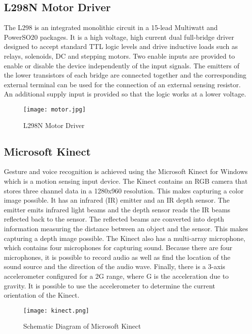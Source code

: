 \subsection{L298N Motor Driver}
The L298 is an integrated monolithic circuit in a 15-lead Multiwatt and PowerSO20 packages. It is a high voltage, high current dual full-bridge driver designed to accept standard TTL logic levels and drive inductive loads such as relays, solenoids, DC and stepping motors. Two enable inputs are provided to enable or disable the device independently of the input signals. The emitters of the lower transistors of each bridge are connected together and the corresponding external terminal can be used for the connection of an external sensing resistor. An additional supply input is provided so that the logic works at a lower voltage.

\begin{figure}[H]
  \centering
  \texttt{[image: motor.jpg]}
  \caption{L298N Motor Driver}
  \label{L298N motor driver}	
\end{figure}



\subsection{Microsoft Kinect}
Gesture and voice recognition is achieved using the Microsoft Kinect for Windows which is a motion sensing input device. The Kinect contains an RGB camera that stores three channel data in a 1280x960 resolution. This makes capturing a color image possible. It has an infrared (IR) emitter and an IR depth sensor. The emitter emits infrared light beams and the depth sensor reads the IR beams reflected back to the sensor. The reflected beams are converted into depth information measuring the distance between an object and the sensor. This makes capturing a depth image possible. The Kinect also has a multi-array microphone, which contains four microphones for capturing sound. Because there are four microphones, it is possible to record audio as well as find the location of the sound source and the direction of the audio wave. Finally, there is a 3-axis accelerometer configured for a 2G range, where G is the acceleration due to gravity. It is possible to use the accelerometer to determine the current orientation of the Kinect.

\begin{figure}[H]
  \centering
  \texttt{[image: kinect.png]}
  \caption{Schematic Diagram of Microsoft Kinect}
  \label{kinect}	
\end{figure}

